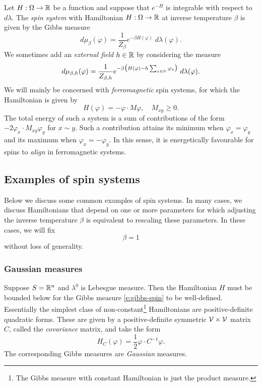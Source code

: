 Let $H : \Omega \rightarrow {\mathbb R}$ be a function and suppose
that $e^{-H}$ is integrable with respect to $d\lambda$.
The \emph{spin system} with Hamiltonian $H : \Omega \rightarrow {\mathbb R}$
at inverse temperature $\beta$ is given by the Gibbs measure
\begin{equation}
\label{e:gibbs-spin}
d\mu_\beta(\varphi)
	=
\frac{1}{Z_\beta} e^{-\beta H(\varphi)} \; d\lambda(\varphi).
\end{equation}
We sometimes add an \emph{external field} $h \in {\mathbb R}$ by considering the measure
\begin{equation}
\label{e:gibbs-spin-ext}
d\mu_{\beta,h}(\varphi)
	=
\frac{1}{Z_{\beta,h}}
e^{-\beta \big(H(\varphi) - h \sum_{x\in\mathcal{V}} \varphi_x\big)} \; d\lambda(\varphi).
\end{equation}
We will mainly be concerned with \emph{ferromagnetic} spin systems, for which the
Hamiltonian is given by
\begin{equation}
H(\varphi) = -\varphi \cdot M\varphi,
	\quad
M_{xy} \ge 0.
\end{equation}
The total energy of such a system is a sum of contributions
of the form $-2 \varphi_x \cdot M_{xy} \varphi_y$ for $x \sim y$. Such a
contribution
attains its minimum when $\varphi_x = \varphi_y$ and its maximum when
$\varphi_x = -\varphi_y$. In this sense, it is energetically favourable
for spins to \emph{align} in ferromagnetic systems.


\subsection{Examples of spin systems}

Below we discuss some common examples of spin systems.
In many cases, we discuss Hamiltonians that depend on one or more parameters
for which adjusting the inverse temperature $\beta$ is equivalent to rescaling
these parameters. In these cases, we will fix
\begin{equation}
\label{e:beta-one}
\beta = 1
\end{equation}
without loss of generality.

\subsubsection{Gaussian measures}

Suppose $S = {\mathbb R}^n$ and $\lambda^0$ is Lebesgue measure. Then the Hamiltonian
$H$ must be bounded below for the Gibbs measure \eqref{e:gibbs-spin} to be
well-defined. Essentially the simplest class of
non-constant\footnote{The Gibbs measure with constant Hamiltonian is just the
product measure.} Hamiltonians
are positive-definite quadratic forms. These are given by a positive-definite
symmetric $\mathcal{V}\times\mathcal{V}$ matrix $C$, called the \emph{covariance}
matrix, and take the form
\begin{equation}
H_C(\varphi) = \frac{1}{2} \varphi \cdot C^{-1} \varphi.
\end{equation}
The corresponding Gibbs measures are \emph{Gaussian} measures.

